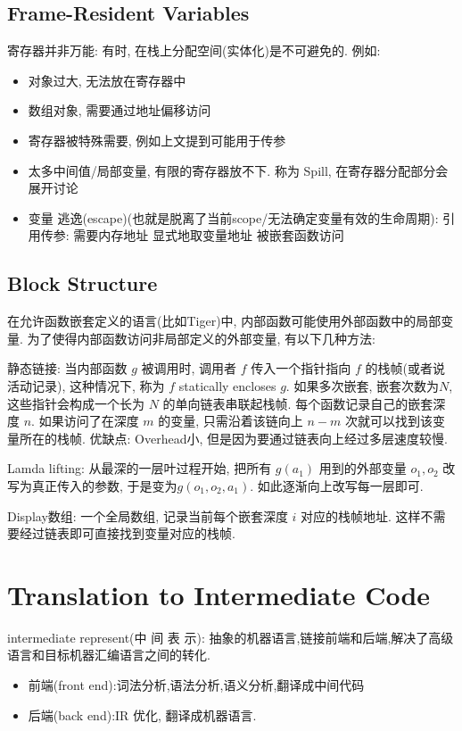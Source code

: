 \subsection{Frame-Resident Variables}
寄存器并非万能: 有时, 在栈上分配空间(实体化)是不可避免的. 例如:
\begin{itemize}
    \item 对象过大, 无法放在寄存器中
    \item 数组对象, 需要通过地址偏移访问
    \item 寄存器被特殊需要, 例如上文提到可能用于传参
    \item 太多中间值/局部变量, 有限的寄存器放不下. 称为 Spill, 在寄存器分配部分会展开讨论
    \item 变量 逃逸(escape)(也就是脱离了当前scope/无法确定变量有效的生命周期): 
    \subitem 引用传参: 需要内存地址
    \subitem 显式地取变量地址
    \subitem 被嵌套函数访问
\end{itemize}

\subsection{Block Structure}
在允许函数嵌套定义的语言(比如Tiger)中, 内部函数可能使用外部函数中的局部变量. 为了使得内部函数访问非局部定义的外部变量, 有以下几种方法: 

静态链接: 当内部函数 $g$ 被调用时, 调用者 $f$ 传入一个指针指向 $f$ 的栈帧(或者说活动记录), 这种情况下, 称为 $f$ statically encloses $g$.  如果多次嵌套, 嵌套次数为$N$, 这些指针会构成一个长为 $N$ 的单向链表串联起栈帧. 每个函数记录自己的嵌套深度 $n$. 如果访问了在深度 $m$ 的变量, 只需沿着该链向上 $n-m$ 次就可以找到该变量所在的栈帧. 优缺点: Overhead小, 但是因为要通过链表向上经过多层速度较慢. 


Lamda lifting: 从最深的一层叶过程开始, 把所有 $g(a_1)$ 用到的外部变量 $o_1, o_2$ 改写为真正传入的参数, 于是变为$g(o_1, o_2, a_1)$. 如此逐渐向上改写每一层即可. 


Display数组: 一个全局数组, 记录当前每个嵌套深度 $i$ 对应的栈帧地址. 这样不需要经过链表即可直接找到变量对应的栈帧. 


\section{Translation to Intermediate Code}
intermediate represent(中 间 表 示): 抽象的机器语言,链接前端和后端,解决了高级语言和目标机器汇编语言之间的转化.

\begin{itemize}
    \item 前端(front end):词法分析,语法分析,语义分析,翻译成中间代码
    \item 后端(back end):IR 优化, 翻译成机器语言.
\end{itemize}

